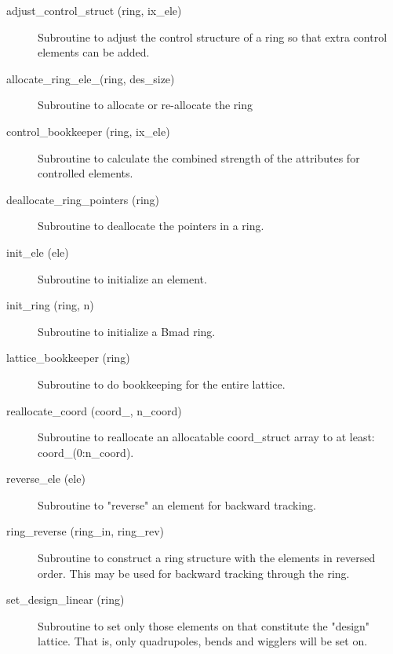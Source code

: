 \begin{description}

\item[adjust\_control\_struct (ring, ix\_ele)] \Newline
Subroutine to adjust the control structure of a ring so that 
extra control elements can be added. 

\item[allocate\_ring\_ele\_(ring, des\_size)] \Newline 
Subroutine to allocate or re-allocate the ring%

\item[control\_bookkeeper (ring, ix\_ele)] \Newline
Subroutine to calculate the combined strength of the attributes for
controlled elements.

\item[deallocate\_ring\_pointers (ring)] \Newline 
Subroutine to deallocate the pointers in a ring.

\item[init\_ele (ele)] \Newline
Subroutine to initialize an element. 

\item[init\_ring (ring, n)] \Newline 
Subroutine to initialize a Bmad ring.

\item[lattice\_bookkeeper (ring)] \Newline 
Subroutine to do bookkeeping for the entire lattice.

\item[reallocate\_coord (coord\_, n\_coord)] \Newline 
Subroutine to reallocate an allocatable  coord\_struct array to at least:
coord\_(0:n\_coord).

\item[reverse\_ele (ele)] \Newline
Subroutine to "reverse" an element for backward tracking. 

\item[ring\_reverse (ring\_in, ring\_rev)] \Newline
Subroutine to construct a ring structure with the elements in reversed 
order. This may be used for backward tracking through the ring. 

\item[set\_design\_linear (ring)] \Newline
Subroutine to set only those elements on that constitute the "design" 
lattice. That is, only quadrupoles, bends and wigglers will be set on. 


\end{description}
